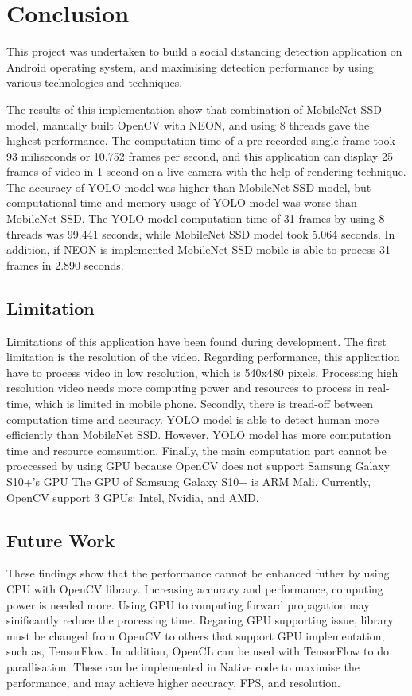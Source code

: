 \chapter{Conclusion}\label{conclusion}

    This project was undertaken to build a social distancing detection application on Android operating system,
    and maximising detection performance by using various technologies and techniques.

    The results of this implementation show that combination of MobileNet SSD model,
    manually built OpenCV with NEON, and using 8 threads gave the highest performance.
    The computation time of a pre-recorded single frame took 93 miliseconds or 10.752 frames per second,
    and this application can display 25 frames of video in 1 second on a live camera
    with the help of rendering technique.
    The accuracy of YOLO model was higher than MobileNet SSD model,
    but computational time and memory usage of YOLO model was worse than MobileNet SSD.
    The YOLO model computation time of 31 frames by using 8 threads was 99.441 seconds,
    while MobileNet SSD model took 5.064 seconds.
    In addition, if NEON is implemented MobileNet SSD mobile is able to process 31 frames in 2.890 seconds.

    \section{Limitation}
        Limitations of this application have been found during development.
        The first limitation is the resolution of the video.
        Regarding performance, this application have to process video in low resolution,
        which is 540x480 pixels.
        Processing high resolution video needs more computing power and resources to process in real-time,
        which is limited in mobile phone.
        Secondly, there is tread-off between computation time and accuracy.
        YOLO model is able to detect human more efficiently than MobileNet SSD.
        However, YOLO model has more computation time and resource comsumtion.
        Finally, the main computation part cannot be proccessed by using GPU
        because OpenCV does not support Samsung Galaxy S10+'s GPU
        The GPU of Samsung Galaxy S10+ is ARM Mali.
        Currently, OpenCV support 3 GPUs: Intel, Nvidia, and AMD.

    \section{Future Work}
        These findings show that the performance cannot be enhanced futher by using CPU with OpenCV library.
        Increasing accuracy and performance, computing power is needed more.
        Using GPU to computing forward propagation may sinificantly reduce the processing time.
        Regaring GPU supporting issue, library must be changed from OpenCV to others that support
        GPU implementation, such as, TensorFlow.
        In addition, OpenCL can be used with TensorFlow to do parallisation.
        These can be implemented in Native code to maximise the performance,
        and may achieve higher accuracy, FPS, and resolution.

